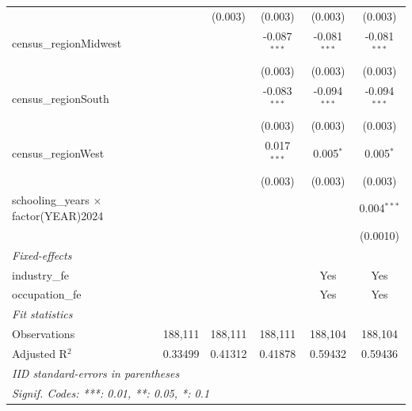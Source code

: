 \begin{tabular}{lccccc}
                                                &                         & (0.003)                 & (0.003)                 & (0.003)                 & (0.003)\\   
   census\_regionMidwest                        &                         &                         & -0.087$^{***}$          & -0.081$^{***}$          & -0.081$^{***}$\\   
                                                &                         &                         & (0.003)                 & (0.003)                 & (0.003)\\   
   census\_regionSouth                          &                         &                         & -0.083$^{***}$          & -0.094$^{***}$          & -0.094$^{***}$\\   
                                                &                         &                         & (0.003)                 & (0.003)                 & (0.003)\\   
   census\_regionWest                           &                         &                         & 0.017$^{***}$           & 0.005$^{*}$             & 0.005$^{*}$\\   
                                                &                         &                         & (0.003)                 & (0.003)                 & (0.003)\\   
   schooling\_years $\times$ factor(YEAR)2024   &                         &                         &                         &                         & 0.004$^{***}$\\   
                                                &                         &                         &                         &                         & (0.0010)\\   
   \midrule
   \emph{Fixed-effects}\\
   industry\_fe                                 &                         &                         &                         & Yes                     & Yes\\  
   occupation\_fe                               &                         &                         &                         & Yes                     & Yes\\  
   \midrule
   \emph{Fit statistics}\\
   Observations                                 & 188,111                 & 188,111                 & 188,111                 & 188,104                 & 188,104\\  
   Adjusted R$^2$                               & 0.33499                 & 0.41312                 & 0.41878                 & 0.59432                 & 0.59436\\  
   \midrule \midrule
   \multicolumn{6}{l}{\emph{IID standard-errors in parentheses}}\\
   \multicolumn{6}{l}{\emph{Signif. Codes: ***: 0.01, **: 0.05, *: 0.1}}\\
\end{tabular}
\par\endgroup


